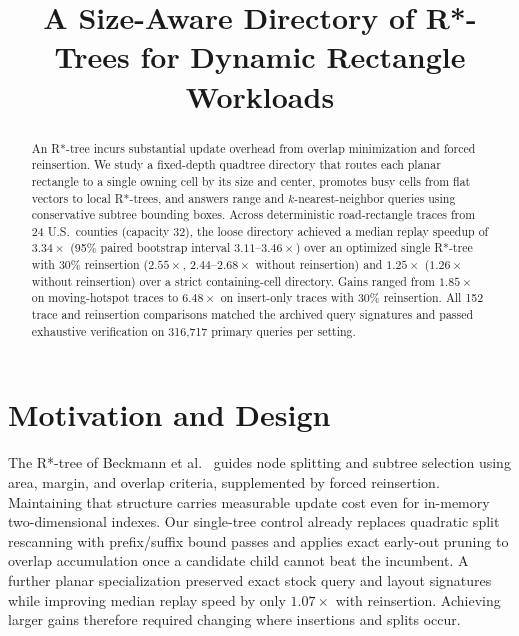 \documentclass[10pt,letterpaper]{article}
\title{A Size-Aware Directory of R*-Trees for Dynamic Rectangle Workloads}
\author{}
\date{}
\begin{document}
\maketitle
\vspace{-2.5em}

\begin{abstract}
An R*-tree incurs substantial update overhead from overlap minimization and forced reinsertion. We study a fixed-depth quadtree directory that routes each planar rectangle to a single owning cell by its size and center, promotes busy cells from flat vectors to local R*-trees, and answers range and $k$-nearest-neighbor queries using conservative subtree bounding boxes. Across deterministic road-rectangle traces from 24 U.S.\ counties (capacity 32), the loose directory achieved a median replay speedup of $3.34\times$ (95\% paired bootstrap interval $3.11\text{--}3.46\times$) over an optimized single R*-tree with 30\% reinsertion ($2.55\times$, $2.44\text{--}2.68\times$ without reinsertion) and $1.25\times$ ($1.26\times$ without reinsertion) over a strict containing-cell directory. Gains ranged from $1.85\times$ on moving-hotspot traces to $6.48\times$ on insert-only traces with 30\% reinsertion. All 152 trace and reinsertion comparisons matched the archived query signatures and passed exhaustive verification on 316,717 primary queries per setting.
\end{abstract}

\section{Motivation and Design}

The R*-tree of Beckmann et al.~\cite{beckmann1990} guides node splitting and subtree selection using area, margin, and overlap criteria, supplemented by forced reinsertion. Maintaining that structure carries measurable update cost even for in-memory two-dimensional indexes. Our single-tree control already replaces quadratic split rescanning with prefix/suffix bound passes and applies exact early-out pruning to overlap accumulation once a candidate child cannot beat the incumbent. A further planar specialization preserved exact stock query and layout signatures while improving median replay speed by only $1.07\times$ with reinsertion. Achieving larger gains therefore required changing where insertions and splits occur.
\end{document}
